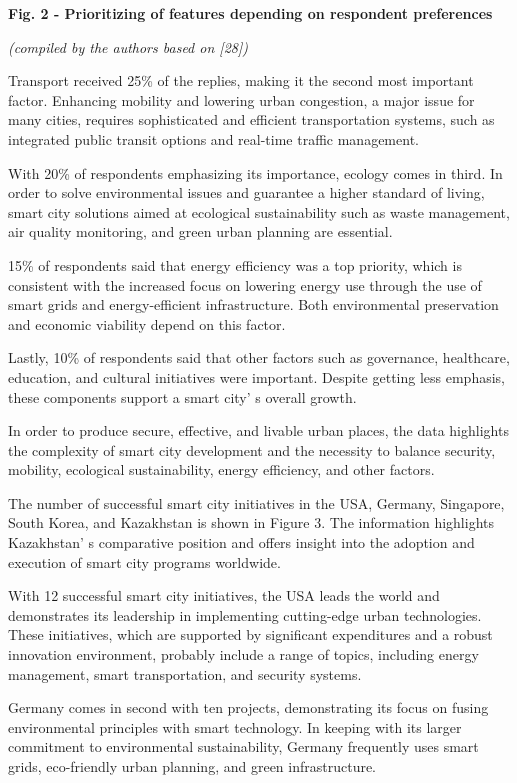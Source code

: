 {{\bfseries Fig. 2 - Prioritizing of features depending on respondent
preferences}

\emph{(compiled by the authors based on {[}28{]})}

Transport received 25\% of the replies, making it the second most
important factor. Enhancing mobility and lowering urban congestion, a
major issue for many cities, requires sophisticated and efficient
transportation systems, such as integrated public transit options and
real-time traffic management.

With 20\% of respondents emphasizing its importance, ecology comes in
third. In order to solve environmental issues and guarantee a higher
standard of living, smart city solutions aimed at ecological
sustainability such as waste management, air quality monitoring, and
green urban planning are essential.

15\% of respondents said that energy efficiency was a top priority,
which is consistent with the increased focus on lowering energy use
through the use of smart grids and energy-efficient infrastructure. Both
environmental preservation and economic viability depend on this factor.

Lastly, 10\% of respondents said that other factors such as governance,
healthcare, education, and cultural initiatives were important. Despite
getting less emphasis, these components support a smart
city' s overall growth.

In order to produce secure, effective, and livable urban places, the
data highlights the complexity of smart city development and the
necessity to balance security, mobility, ecological sustainability,
energy efficiency, and other factors.

The number of successful smart city initiatives in the USA, Germany,
Singapore, South Korea, and Kazakhstan is shown in Figure 3. The
information highlights Kazakhstan' s comparative position
and offers insight into the adoption and execution of smart city
programs worldwide.

With 12 successful smart city initiatives, the USA leads the world and
demonstrates its leadership in implementing cutting-edge urban
technologies. These initiatives, which are supported by significant
expenditures and a robust innovation environment, probably include a
range of topics, including energy management, smart transportation, and
security systems.

Germany comes in second with ten projects, demonstrating its focus on
fusing environmental principles with smart technology. In keeping with
its larger commitment to environmental sustainability, Germany
frequently uses smart grids, eco-friendly urban planning, and green
infrastructure.

}
